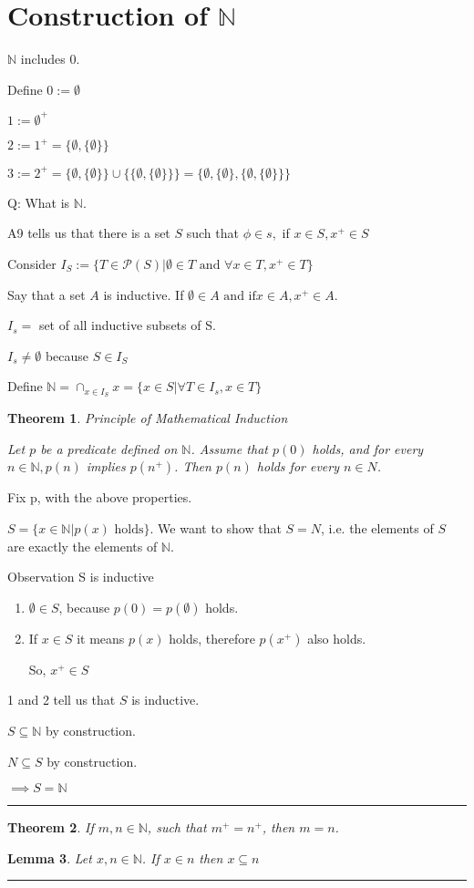 \documentclass[twoside]{article}
\newcounter{lecnum}
\newcommand{\N}{\mathbb{N}}
\newcommand{\PS}{\mathcal P}
\newtheorem{theorem}{Theorem}[lecnum]
\newtheorem{lemma}[theorem]{Lemma}
\newenvironment{proof}{{\bf Proof:}}{\hfill\rule{2mm}{2mm}}
\begin{document}
\section{Construction  of $\N$}

$\N$ includes 0.

Define $0 := \emptyset$

$1 := \emptyset^+$


$2 := 1^+ = \{\emptyset, \{\emptyset\}\}$

$3 := 2^+ = \{\emptyset, \{\emptyset\}\} \cup \{\{\emptyset, \{ \emptyset\}\}\} = \{\emptyset, \{\emptyset\},\{\emptyset, \{ \emptyset\}\}\}$

Q: What is $\N$.

A9 tells us that there is a set $S$ such that $\phi \in s,$ if $x \in S, x^+ \in S$

Consider $I_S := \{T \in \PS (S) \vert \emptyset \in T \text{ and } \forall x \in T, x^+ \in T\}$

Say that a set $A$ is inductive. If $\emptyset \in A \text{ and if} x \in A, x^+ \in A$.

$I_s =$ set of all inductive subsets of S.

$I_s \neq \emptyset$ because $S \in I_S$

Define $\N = \cap_{x \in I_S} x = \{ x \in S \vert \forall T \in I_s, x \in T\}$

\begin{theorem}{Principle of Mathematical Induction}

    Let $p$ be a predicate defined on $\N$. Assume that $p(0)$ holds, and for every $n \in \N, p(n)$ implies $p (n^+)$.
    Then $p(n)$ holds for every $n \in N$.

\end{theorem}

\begin{proof}
    Fix p, with the above properties.

    $S = \{x \in \N \vert p(x) \text{ holds}\}$.
    We want to show that $S = N$, i.e. the elements of $S$ are exactly the elements of $\N$.

    Observation
    S is inductive
    \begin{enumerate}
        \item $\emptyset \in S$, because $p(0) = p(\emptyset)$ holds.
        \item If $x \in S$ it means $p(x)$ holds, therefore $p(x^+)$ also holds.

              So, $x^+ \in S$
    \end{enumerate}

    1 and 2 tell us that $S$ is inductive.

    $S \subseteq \N$ by construction.

    $N \subseteq S$ by construction.

    $\implies S = \N$
\end{proof}

\begin{theorem}
    If $m, n \in \N$, such that $m^+ = n^+$, then $m = n$.
\end{theorem}

\begin{proof}
    \begin{lemma}
        Let $x, n \in \N$.
        If $x \in n$ then $x \subseteq n$
    \end{lemma}
\end{proof}
\end{document}
